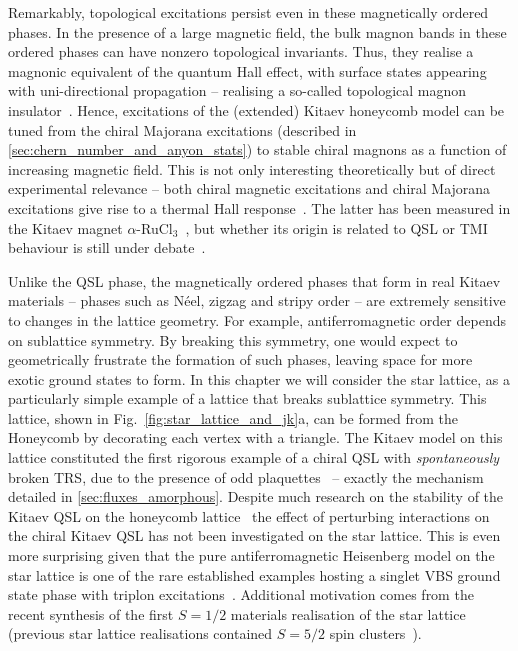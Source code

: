 Remarkably, topological excitations persist even in these magnetically ordered phases. In the presence of a large magnetic field, the bulk magnon bands in these ordered phases can have nonzero topological invariants. Thus, they realise a magnonic equivalent of the quantum Hall effect, with surface states appearing with uni-directional propagation -- realising a so-called topological magnon insulator~\cite{mcclarty_topological_2018,katsura_theory_2010,zhang_topological_2013,mook_edge_2014,mcclarty_topological_2022}. Hence, excitations of the (extended) Kitaev honeycomb model can be tuned from the chiral Majorana excitations (described in \textsection \ref{sec:chern_number_and_anyon_stats}) to stable chiral magnons as a function of increasing magnetic field. This is not only interesting theoretically but of direct experimental relevance -- both chiral magnetic excitations and chiral Majorana excitations give rise to a thermal Hall response~\cite{katsura_theory_2010,matsumoto_theoretical_2011}. The latter has been measured in the Kitaev magnet $\alpha$-RuCl$_3$~\cite{kasahara_majorana_2018,bruin_majorana_2022}, but whether its origin is related to QSL or TMI behaviour is still under debate~\cite{czajka_planar_2023,chern_sign_2021}.  

Unlike the QSL phase, the magnetically ordered phases that form in real Kitaev materials -- phases such as N\'eel, zigzag and stripy order -- are extremely sensitive to changes in the lattice geometry. For example, antiferromagnetic order depends on sublattice symmetry. By breaking this symmetry, one would expect to geometrically frustrate the formation of such phases, leaving space for more exotic ground states to form. In this chapter we will consider the star lattice, as a particularly simple example of a lattice that breaks sublattice symmetry. This lattice, shown in Fig.~\ref{fig:star_lattice_and_jk}a, can be formed from the Honeycomb by decorating each vertex with a triangle. The Kitaev model on this lattice constituted the first rigorous example of a chiral QSL with {\it spontaneously} broken TRS, due to the presence of odd plaquettes~\cite{yao_exact_2007} -- exactly the mechanism detailed in \textsection\ref{sec:fluxes_amorphous}. Despite much research on the stability of the Kitaev QSL on the honeycomb lattice~\cite{winter_models_2017,hermanns_physics_2018,trebst_kitaev_2022} the effect of perturbing interactions on the chiral Kitaev QSL has not been investigated on the star lattice. This is even more surprising given that the pure antiferromagnetic Heisenberg model on the star lattice is one of the rare established examples hosting a singlet VBS ground state phase with triplon excitations~\cite{richter_absence_2004,choy_classification_2009,yang_competing_2010, jahromi_spin-frac12_2018,jahromi_infinite_2018,ran_emergent_2018}. Additional motivation comes from the recent synthesis of the first $S=1/2$ materials realisation of the star lattice~\cite{sorolla_synthesis_2020,ji_dielectric_2022} (previous star lattice realisations contained $S=5/2$ spin clusters~\cite{zheng_star_2007}).  

